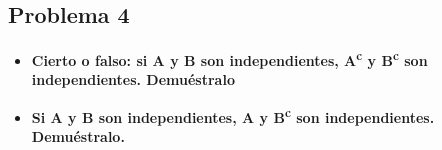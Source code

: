 \subsection*{Problema 4}
\begin{itemize}
    \item \textbf{Cierto o falso: si A y B son independientes, A\textsuperscript{c} y B\textsuperscript{c} son independientes. Demuéstralo}
    \item \textbf{Si A y B son independientes, A y B\textsuperscript{c} son independientes. Demuéstralo.}
\end{itemize}